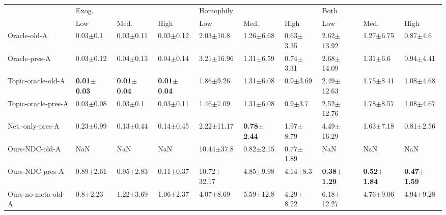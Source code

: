 \begin{tabular}{llllllllll}
\toprule
{} & \multicolumn{3}{l}{Exog.} & \multicolumn{3}{l}{Homophily} & \multicolumn{3}{l}{Both} \\
{} &                     Low &                    Med. &                    High &                     Low &                    Med. &                    High &                     Low &                    Med. &                    High \\
\midrule
Oracle-old-A        &            0.03$\pm$0.1 &           0.03$\pm$0.11 &           0.03$\pm$0.12 &           2.03$\pm$10.8 &           1.26$\pm$6.68 &           0.63$\pm$3.35 &          2.62$\pm$13.92 &           1.27$\pm$6.75 &            0.87$\pm$4.6 \\
Oracle-pres-A       &           0.03$\pm$0.12 &           0.04$\pm$0.13 &           0.04$\pm$0.14 &          3.21$\pm$16.96 &           1.31$\pm$6.59 &           0.74$\pm$3.31 &          2.68$\pm$14.09 &            1.31$\pm$6.6 &           0.94$\pm$4.41 \\
Topic-oracle-old-A  &  \textbf{0.01$\pm$0.03} &  \textbf{0.01$\pm$0.04} &  \textbf{0.01$\pm$0.04} &           1.86$\pm$9.26 &           1.31$\pm$6.08 &            0.9$\pm$3.69 &          2.49$\pm$12.63 &           1.75$\pm$8.41 &           1.08$\pm$4.68 \\
Topic-oracle-pres-A &           0.03$\pm$0.08 &            0.03$\pm$0.1 &           0.03$\pm$0.11 &           1.46$\pm$7.09 &           1.31$\pm$6.08 &             0.9$\pm$3.7 &          2.52$\pm$12.76 &           1.78$\pm$8.57 &           1.08$\pm$4.67 \\
Net.-only-pres-A    &           0.23$\pm$0.99 &           0.13$\pm$0.44 &           0.14$\pm$0.45 &          2.22$\pm$11.17 &  \textbf{0.78$\pm$2.44} &           1.97$\pm$8.79 &          4.49$\pm$16.29 &           1.63$\pm$7.18 &           0.81$\pm$2.56 \\
Ours-NDC-old-A      &                     NaN &                     NaN &                     NaN &          10.44$\pm$37.8 &           0.82$\pm$2.15 &           0.77$\pm$1.89 &                     NaN &                     NaN &                     NaN \\
Ours-NDC-pres-A     &           0.89$\pm$2.61 &           0.95$\pm$2.83 &           0.11$\pm$0.37 &         10.72$\pm$32.17 &           4.85$\pm$9.98 &            4.14$\pm$8.3 &  \textbf{0.38$\pm$1.29} &  \textbf{0.52$\pm$1.84} &  \textbf{0.47$\pm$1.59} \\
Ours-no-meta-old-A  &            0.8$\pm$2.23 &           1.22$\pm$3.69 &           1.06$\pm$2.37 &           4.07$\pm$8.69 &           5.59$\pm$12.8 &           4.29$\pm$8.22 &          6.18$\pm$12.27 &           4.76$\pm$9.06 &           4.94$\pm$9.28 \\

\end{tabular}

